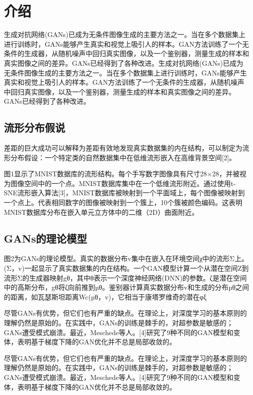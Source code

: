 
\newpage

\section{介绍}

生成对抗网络(GANs)已成为无条件图像生成的主要方法之一。当在多个数据集上进行训练时，GANs能够产生真实和视觉上吸引人的样本。GAN方法训练了一个无条件的生成器，从随机噪声中回归真实图像，以及一个鉴别器，测量生成的样本和真实图像之间的差异。GANs已经得到了各种改进。生成对抗网络(GANs)已成为无条件图像生成的主要方法之一。当在多个数据集上进行训练时，GANs能够产生真实和视觉上吸引人的样本。GAN方法训练了一个无条件的生成器，从随机噪声中回归真实图像，以及一个鉴别器，测量生成的样本和真实图像之间的差异。GANs已经得到了各种改进。

\subsection{流形分布假说}

差距的巨大成功可以解释为差距有效地发现真实数据集的内在结构，可以制定为流形分布假设：一个特定类的自然数据集中在低维流形嵌入在高维背景空间[2]。

图1显示了MNIST数据库的流形结构。每个手写数字图像具有尺寸28×28，并被视为图像空间中的一个点。MNIST数据库集中在一个低维流形附近。通过使用t-SNE流形嵌入算法[3]，MNIST数据库被映射到一个平面域上，每个图像被映射到一个点上。代表相同数字的图像被映射到一个簇上，10个簇被颜色编码。这表明MNIST数据库分布在嵌入单元立方体中的二维（2D）曲面附近。

\subsection{GANs的理论模型}

图2为GANs的理论模型。真实的数据分布v集中在嵌入在环境空间χ中的流形Σ上。(Σ，v)一起显示了真实数据集的内在结构。一个GAN模型计算一个从潜在空间Z到流形Σ的生成器映射gθ，其中θ表示一个深度神经网络(DNN)的参数。ζ是潜在空间中的高斯分布，gθ将ζ向前推到µθ。鉴别器计算真实数据分布v和生成的分布µθ之间的距离，如瓦瑟斯坦距离Wc(µθ，v)，它相当于康塔罗维奇的潜在φξ

尽管GANs有优势，但它们也有严重的缺点。在理论上，对深度学习的基本原则的理解仍然是原始的。在实践中，GANs的训练是棘手的，对超参数是敏感的；GANs遭受模式崩溃。最近，Meschede等人。[4]研究了9种不同的GAN模型和变体，表明基于梯度下降的GAN优化并不总是局部收敛的。

尽管GANs有优势，但它们也有严重的缺点。在理论上，对深度学习的基本原则的理解仍然是原始的。在实践中，GANs的训练是棘手的，对超参数是敏感的；GANs遭受模式崩溃。最近，Meschede等人。[4]研究了9种不同的GAN模型和变体，表明基于梯度下降的GAN优化并不总是局部收敛的。

